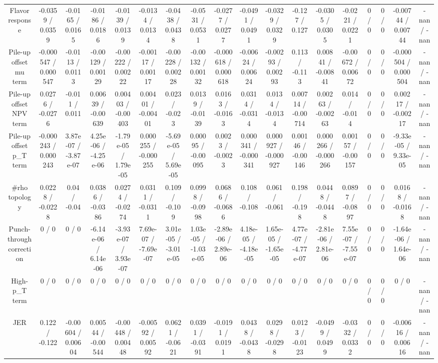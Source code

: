 \documentclass[10pt]{article}
\begin{document}
\begin{table}[htbp]
\begin{center}
\begin{tabular}{|c|c|c|c|c|c|c|c|c|c|c|c|c|c|c|c|c|c|}
  Flavor response & -0.0359 / 0.0359 & -0.0165 / 0.0165 & -0.0186 / 0.0186 & -0.0139 / 0.0139 & -0.0134 / 0.0134 & -0.0438 / 0.0438 & -0.0531 / 0.0531 & -0.0277 / 0.0277 & -0.0491 / 0.0491 & -0.0329 / 0.0329 & -0.127 / 0.127 & -0.0305 / 0.0305 & -0.0221 / 0.0221 & 0 / 0 & 0 / 0 & -0.00744 / 0.00744 & -nan / -nan \\ 
  Pile-up offset mu term & -0.000547 / 0.000547 & -0.0113 / 0.0113 & -0.00129 / 0.00129 & -0.00222 / 0.00222 & -0.00117 / 0.00117 & -0.00228 / 0.00228 & -0.00132 / 0.00132 & -0.000618 / 0.000618 & -0.00624 / 0.00624 & -0.00293 / 0.00293 & 0.113 / -0.113 & 0.00841 / -0.00841 & -0.00672 / 0.00672 & 0 / 0 & 0 / 0 & -0.000504 / 0.000504 & -nan / -nan \\ 
  Pile-up offset NPV term & 0.0276 / -0.0276 & -0.011 / 0.011 & 0.00639 / -0.00639 & 0.00403 / -0.00403 & 0.00401 / -0.00401 & 0.023 / -0.023 & 0.0139 / -0.0139 & 0.0163 / -0.0163 & 0.0314 / -0.0314 & 0.0134 / -0.0134 & 0.00714 / -0.00714 & 0.00263 / -0.00263 & 0.014 / -0.014 & 0 / 0 & 0 / 0 & 0.00217 / -0.00217 & -nan / -nan \\ 
  Pile-up offset p_{T} term & -0.000243 / 0.000243 & 3.87e-07 / -3.87e-07 & 4.25e-06 / -4.25e-06 & -1.79e-05 / 1.79e-05 & 0.000255 / -0.000255 & -5.69e-05 / 5.69e-05 & 0.00095 / -0.00095 & 0.0023 / -0.0023 & 0.000341 / -0.000341 & 0.000927 / -0.000927 & 0.00146 / -0.00146 & 0.000266 / -0.000266 & 0.00157 / -0.00157 & 0 / 0 & 0 / 0 & -9.33e-05 / 9.33e-05 & -nan / -nan \\ 
  #rho topology & 0.0228 / -0.0228 & 0.04 / -0.04 & 0.0386 / -0.0386 & 0.0274 / -0.0274 & 0.0311 / -0.0311 & 0.109 / -0.109 & 0.0998 / -0.0998 & 0.0686 / -0.0686 & 0.108 / -0.108 & 0.061 / -0.061 & 0.198 / -0.198 & 0.0448 / -0.0448 & 0.0897 / -0.0897 & 0 / 0 & 0 / 0 & 0.0168 / -0.0168 & -nan / -nan \\ 
  Punch-through correction & 0 / 0 & 0 / 0 & -6.14e-06 / 6.14e-06 & -3.93e-07 / 3.93e-07 & 7.69e-07 / -7.69e-07 & 3.01e-05 / -3.01e-05 & 1.03e-05 / -1.03e-05 & -2.89e-06 / 2.89e-06 & 4.18e-05 / -4.18e-05 & 1.65e-05 / -1.65e-05 & 4.77e-07 / -4.77e-07 & -2.81e-06 / 2.81e-06 & 7.55e-07 / -7.55e-07 & 0 / 0 & 0 / 0 & -1.64e-06 / 1.64e-06 & -nan / -nan \\ 
  High-p_{T} term & 0 / 0 & 0 / 0 & 0 / 0 & 0 / 0 & 0 / 0 & 0 / 0 & 0 / 0 & 0 / 0 & 0 / 0 & 0 / 0 & 0 / 0 & 0 / 0 & 0 / 0 & 0 / 0 & 0 / 0 & 0 / 0 & -nan / -nan \\ 
  JER & 0.122 / -0.122 & -0.00604 / 0.00604 & 0.00544 / -0.00544 & -0.00448 / 0.00448 & -0.00592 / 0.00592 & 0.0621 / -0.0621 & 0.0391 / -0.0391 & -0.0191 / 0.0191 & 0.0438 / -0.0438 & 0.0298 / -0.0298 & 0.0123 / -0.0123 & -0.0499 / 0.0499 & -0.0332 / 0.0332 & 0 / 0 & 0 / 0 & -0.00616 / 0.00616 & -nan / -nan \\ 

\end{tabular}
\end{center}
\end{table}
\end{document}
